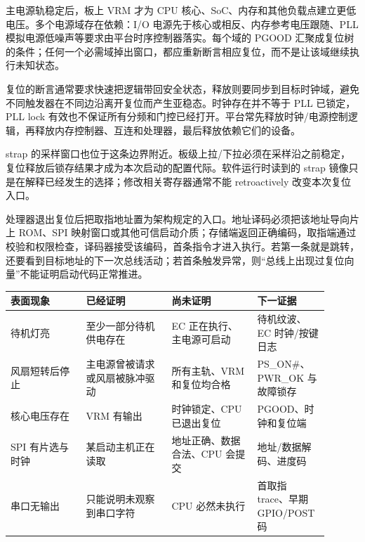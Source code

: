 主电源轨稳定后，板上 VRM 才为 CPU 核心、SoC、内存和其他负载点建立更低电压。多个电源域存在依赖：I/O 电源先于核心或相反、内存参考电压跟随、PLL 模拟电源低噪声等要求由平台时序控制器落实。每个域的 PGOOD 汇聚成复位树的条件；任何一个必需域掉出窗口，都应重新断言相应复位，而不是让该域继续执行未知状态。


复位的断言通常要求快速把逻辑带回安全状态，释放则要同步到目标时钟域，避免不同触发器在不同边沿离开复位而产生亚稳态。时钟存在并不等于 PLL 已锁定，PLL lock 有效也不保证所有分频和门控已经打开。平台常先释放时钟/电源控制逻辑，再释放内存控制器、互连和处理器，最后释放依赖它们的设备。

strap 的采样窗口也位于这条边界附近。板级上拉/下拉必须在采样沿之前稳定，复位释放后锁存结果才成为本次启动的配置代际。软件运行时读到的 strap 镜像只是在解释已经发生的选择；修改相关寄存器通常不能 retroactively 改变本次复位入口。


处理器退出复位后把取指地址置为架构规定的入口。地址译码必须把该地址导向片上 ROM、SPI 映射窗口或其他可信启动介质；存储端返回正确编码，取指端通过校验和权限检查，译码器接受该编码，首条指令才进入执行。若第一条就是跳转，还要看到目标地址的下一次总线活动；若首条触发异常，则“总线上出现过复位向量”不能证明启动代码正常推进。

\Needspace{0.34\textheight}
\begin{longtable}{L{0.22\linewidth}L{0.25\linewidth}L{0.25\linewidth}L{0.18\linewidth}}
\toprule
表面现象 & 已经证明 & 尚未证明 & 下一证据 \\
\midrule
待机灯亮 & 至少一部分待机供电存在 & EC 正在执行、主电源可启动 & 待机纹波、EC 时钟/按键日志 \\\tablerowrule
风扇短转后停止 & 主电源曾被请求或风扇被脉冲驱动 & 所有主轨、VRM 和复位均合格 & PS\_ON\#、PWR\_OK 与故障锁存 \\\tablerowrule
核心电压存在 & VRM 有输出 & 时钟锁定、CPU 已退出复位 & PGOOD、时钟和复位端 \\\tablerowrule
SPI 有片选与时钟 & 某启动主机正在读取 & 地址正确、数据合法、CPU 会提交 & 地址/数据解码、进度码 \\\tablerowrule
串口无输出 & 只能说明未观察到串口字符 & CPU 必然未执行 & 首取指 trace、早期 GPIO/POST 码 \\
\bottomrule
\end{longtable}


